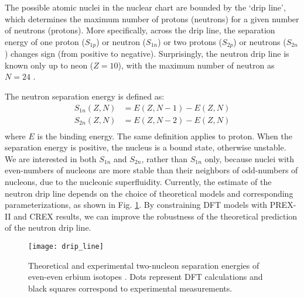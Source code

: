 The possible atomic nuclei in the nuclear chart are bounded by the 
`drip line', which determines the maximum number of protons (neutrons) for a 
given number of neutrons (protons). More specifically, across the drip line, the
separation energy of one proton ($S_{1p}$) or neutron ($S_{1n}$) 
or two protons ($S_{2p}$) or neutrons ($S_{2n}$) changes sign (from positive to negative).
Surprisingly, the neutron drip line is known only up to neon ($Z=10$), with the 
maximum number of neutron as $N=24$ \cite{PhysRevLett.123.212501}. 


The neutron separation energy is defined as:
\begin{equation}
    \begin{aligned}
	S_{1n}(Z, N) &= E(Z, N-1) - E(Z, N) \\
	S_{2n}(Z, N) &= E(Z, N-2) - E(Z, N) \\
    \end{aligned}
\end{equation}
where $E$ is the binding energy. The same definition applies to proton.
When the separation energy is positive, the nucleus is a bound state, otherwise unstable.
We are interested in both $S_{1n}$ and $S_{2n}$, rather than $S_{1n}$ only, because nuclei
with even-numbers of nucleons are more stable than their neighbors of odd-numbers
of nucleons, due to the nucleonic superfluidity. Currently, the estimate of the
neutron drip line depends on the choice of theoretical models and corresponding
parameterizations, as shown in Fig. \ref{fig:neutron_drip_line}. By constraining
DFT models with PREX-II and CREX results, we can improve the robustness of the theoretical
prediction of the neutron drip line.
\begin{figure}[!h]
    \centering
    \texttt{[image: drip\_line]}
    \caption[2-neutron separation energy]
    {Theoretical and experimental two-nucleon separation energies of
    even-even erbium isotopes \cite{Erler2012}. Dots represent DFT calculations
    and black squares correspond to experimental measurements.
    }
    \label{fig:neutron_drip_line}
\end{figure}

